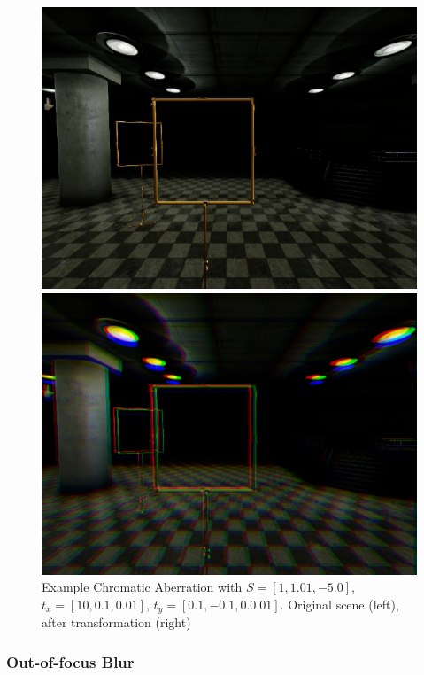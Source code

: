 \begin{figure}[htbp]
	\centering
	\begin{minipage}{0.49\textwidth}
		\includegraphics[width=\textwidth]{fig/gate_example}
	\end{minipage}
	\begin{minipage}{0.49\textwidth}
		\includegraphics[width=\textwidth]{fig/gate_example_chromatic}
	\end{minipage}
	\caption{Example Chromatic Aberration with $S=[1, 1.01, -5.0]$, $t_x=[10,0.1,0.01]$, $t_y=[0.1,-0.1,0.0.01]$. Original scene (left), after transformation (right)}
	\label{fig:chromatic}
\end{figure}

\subsubsection{Out-of-focus Blur}


